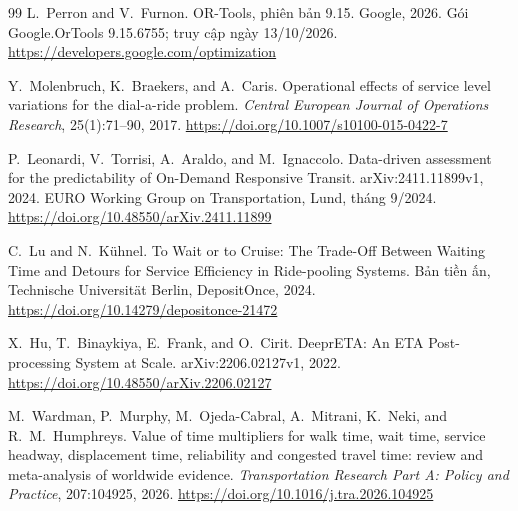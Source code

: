 \begin{thebibliography}{99}
L.~Perron and V.~Furnon.
\newblock OR-Tools, phiên bản 9.15.
\newblock Google, 2026. Gói Google.OrTools 9.15.6755; truy cập ngày 13/10/2026.
\newblock \url{https://developers.google.com/optimization}

Y.~Molenbruch, K.~Braekers, and A.~Caris.
\newblock Operational effects of service level variations for the dial-a-ride problem.
\newblock \emph{Central European Journal of Operations Research}, 25(1):71--90, 2017.
\newblock \url{https://doi.org/10.1007/s10100-015-0422-7}

P.~Leonardi, V.~Torrisi, A.~Araldo, and M.~Ignaccolo.
\newblock Data-driven assessment for the predictability of On-Demand Responsive Transit.
\newblock arXiv:2411.11899v1, 2024. EURO Working Group on Transportation, Lund, tháng 9/2024.
\newblock \url{https://doi.org/10.48550/arXiv.2411.11899}

C.~Lu and N.~Kühnel.
\newblock To Wait or to Cruise: The Trade-Off Between Waiting Time and Detours for Service Efficiency in Ride-pooling Systems.
\newblock Bản tiền ấn, Technische Universität Berlin, DepositOnce, 2024.
\newblock \url{https://doi.org/10.14279/depositonce-21472}

X.~Hu, T.~Binaykiya, E.~Frank, and O.~Cirit.
\newblock DeeprETA: An ETA Post-processing System at Scale.
\newblock arXiv:2206.02127v1, 2022.
\newblock \url{https://doi.org/10.48550/arXiv.2206.02127}

M.~Wardman, P.~Murphy, M.~Ojeda-Cabral, A.~Mitrani, K.~Neki, and R.~M.~Humphreys.
\newblock Value of time multipliers for walk time, wait time, service headway, displacement time, reliability and congested travel time: review and meta-analysis of worldwide evidence.
\newblock \emph{Transportation Research Part A: Policy and Practice}, 207:104925, 2026.
\newblock \url{https://doi.org/10.1016/j.tra.2026.104925}


\end{thebibliography}
